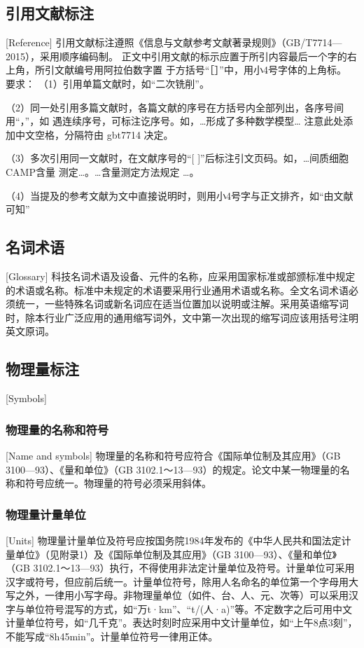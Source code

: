 \subsection{引用文献标注}[Reference]
引用文献标注遵照《信息与文献参考文献著录规则》（GB/T7714—2015），采用顺序编码制。
正文中引用文献的标示应置于所引内容最后一个字的右上角，所引文献编号用阿拉伯数字置
于方括号“［］”中，用小4号字体的上角标。
要求：
（1）引用单篇文献时，如“二次铣削\cite{cnproceed}”。
\nocite{zhao1998}

（2）同一处引用多篇文献时，各篇文献的序号在方括号内全部列出，各序号间用“，”，如
遇连续序号，可标注讫序号。如，…形成了多种数学模型\cite{cnarticle,cnproceed}…
注意此处添加中文空格，分隔符由 gbt7714 决定。

（3）多次引用同一文献时，在文献序号的“[ ]”后标注引文页码。如，…间质细胞CAMP含量
测定\cite[100-197]{cnarticle}…。…含量测定方法规定
\cite[92]{cnarticle}…。

（4）当提及的参考文献为文中直接说明时，则用小4号字与正文排齐，如“由文献可知”

\subsection{名词术语}[Glossary]
科技名词术语及设备、元件的名称，应采用国家标准或部颁标准中规定的术语或名称。标准中未规定的术语要采用行业通用术语或名称。全文名词术语必须统一，一些特殊名词或新名词应在适当位置加以说明或注解。采用英语缩写词时，除本行业广泛应用的通用缩写词外，文中第一次出现的缩写词应该用括号注明英文原词。

\subsection{物理量标注}[Symbols]
\subsubsection{物理量的名称和符号}[Name and symbols]
物理量的名称和符号应符合《国际单位制及其应用》（GB 3100—93）、《量和单位》（GB 3102.1～13—93）的规定。论文中某一物理量的名称和符号应统一。物理量的符号必须采用斜体。

\subsubsection{物理量计量单位}[Units]
物理量计量单位及符号应按国务院1984年发布的《中华人民共和国法定计量单位》（见附录1）及《国际单位制及其应用》（GB 3100—93）、《量和单位》（GB 3102.1～13—93）执行，不得使用非法定计量单位及符号。计量单位可采用汉字或符号，但应前后统一。计量单位符号，除用人名命名的单位第一个字母用大写之外，一律用小写字母。非物理量单位（如件、台、人、元、次等）可以采用汉字与单位符号混写的方式，如“万t·km”、“t/(人·a)”等。不定数字之后可用中文计量单位符号，如“几千克”。表达时刻时应采用中文计量单位，如“上午8点3刻”，不能写成“8h45min”。计量单位符号一律用正体。

